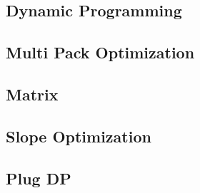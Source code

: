 \documentclass[utf8,8pt]{article}
\begin{document}
\begin{CJK}{UTF8}{gbsn}
\section{Dynamic Programming}
	\subsection{Multi Pack Optimization}
		
	\subsection{Matrix}
		
	\subsection{Slope Optimization}
		
	\subsection{Plug DP}
		
\clearpage	
\end{CJK}
\end{document}
